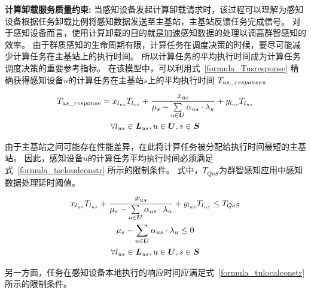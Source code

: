 \textbf{计算卸载服务质量约束:}
当感知设备发起计算卸载请求时，该过程可以理解为感知设备根据任务卸载比例将感知数据发送至主基站，主基站反馈任务完成信号。
对于感知设备而言，使用计算卸载的目的就是加速感知数据的处理以调高群智感知的效率。
由于群质感知的生命周期有限，计算任务在调度决策的时候，要尽可能减少计算任务在主基站上的执行时间。
所以计算任务的平均执行时间成为计算任务调度决策的重要参考指标。
在该模型中，可以利用式~\eqref{formula_Tusresponse} 精确获得感知设备$u$的计算任务在主基站$s$上的平均执行时间 ${T}_{us\_response}$。


\begin{equation}
\label{formula_Tusresponse}
\begin{gathered}
{T}_{us\_response} = x_{l_{us}} T_{l_{us}} + \frac{{x}_{us}}{{\mu}_{s}-\sum\limits_{u \in \boldsymbol{U}}{\alpha}_{us} \cdot {\lambda}_{u}} + y_{l_{us}} T_{l_{us}}\\
\forall l_{us} \in \boldsymbol{L}_{us}, u\in \boldsymbol{U}, s\in \boldsymbol{S}\\
\end{gathered}
\end{equation}

由于主基站之间可能存在性能差异，在此将计算任务被分配给执行时间最短的主基站。
因此，感知设备$u$的计算任务平均执行时间必须满足式~\eqref{formula_tscloudconstr} 所示的限制条件。
式中，$T_{QoS}$为群智感知应用中感知数据处理延时阈值。

\begin{equation}
\label{formula_tscloudconstr}
\begin{gathered}
x_{l_{us}} T_{l_{us}} + \frac{{x}_{us}}{{\mu}_{s}-\sum\limits_{u \in \boldsymbol{U}}{\alpha}_{us} \cdot {\lambda}_{u}} + y_{l_{us}} T_{l_{us}} \leq T_{QoS}\\
{\mu}_{s}-\sum\limits_{u \in \boldsymbol{U}}{\alpha}_{us} \cdot {\lambda}_{u} \leq 0\\
\forall l_{us} \in \boldsymbol{L}_{us}, u\in \boldsymbol{U}, s \in \boldsymbol{S}\\
\end{gathered}
\end{equation}

另一方面，任务在感知设备本地执行的响应时间应满足式~\eqref{formula_tulocalconstr} 所示的限制条件。

